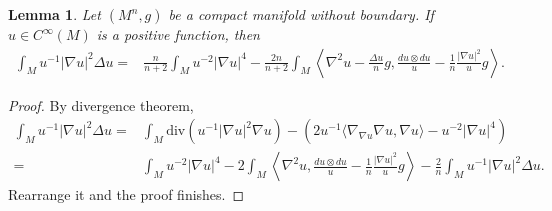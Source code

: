 \documentclass[12pt]{amsart}
\newtheorem{lemma}{Lemma}
\numberwithin{equation}{section}
\numberwithin{lemma}{section}
\numberwithin{proposition}{section}
\numberwithin{corollary}{section}
\numberwithin{remark}{section}
\begin{document}
    \begin{lemma}\label{lem.grad squared laplace}
        Let $(M^n,g)$ be a compact manifold without boundary. If $u\in C^{\infty}(M)$ is a positive function, then
        \begin{align*}
            \int_M u^{-1}|\nabla u|^2\Delta u
            =&\frac{n}{n+2}\int_M u^{-2}|\nabla u|^4
            -\frac{2n}{n+2}\int_M \left\langle\nabla^2 u-\frac{\Delta u}{n}g,\frac{du\otimes du}{u}-\frac{1}{n}\frac{|\nabla u|^2}{u}g\right\rangle.
        \end{align*}
    \end{lemma}
    \begin{proof}
        By divergence theorem,
        \begin{align*}
            \int_M u^{-1}|\nabla u|^2\Delta u
            =&\int_M\mathrm{div}(u^{-1}|\nabla u|^2\nabla u)-(2u^{-1}\langle\nabla_{\nabla u}\nabla u,\nabla u\rangle-u^{-2}|\nabla u|^4)\\
            =&\int_M u^{-2}|\nabla u|^4
            -2\int_M \left\langle\nabla ^2u,\frac{du\otimes du}{u}-\frac{1}{n}\frac{|\nabla u|^2}{u}g\right\rangle
            -\frac{2}{n}\int_M u^{-1}|\nabla u|^2\Delta u.
        \end{align*}
        Rearrange it and the proof finishes.
    \end{proof}
\end{document}
